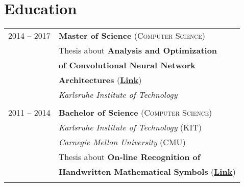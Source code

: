 \documentclass[a4paper,10pt]{article} %
\begin{document}
{\begin{minipage}[t]{0.44\textwidth}

\section{Education}

\begin{tabular}{rl} %


2014 -- 2017 & \textbf{Master of Science} (\textsc{Computer Science})\\
& Thesis about {\textbf{\color{headings}Analysis and Optimization}}\\
& {\textbf{\color{headings}of Convolutional Neural Network}}\\
& {\textbf{\color{headings}Architectures}} (\textbf{\href{https://arxiv.org/abs/1707.09725}{Link}})\\
& \textit{Karlsruhe Institute of Technology}\\
&\\


2011 -- 2014 & \textbf{Bachelor of Science} (\textsc{Computer Science})\\
& \textit{Karlsruhe Institute of Technology} (KIT)\\
& \textit{Carnegie Mellon University} (CMU)\\
& Thesis about {\textbf{\color{headings}On-line Recognition of}}\\
& {\textbf{\color{headings}Handwritten Mathematical Symbols}} (\textbf{\href{http://martin-thoma.com/write-math/}{Link}})\\
&\\


\end{tabular}\\[10pt]



\end{minipage}}
\end{document}

